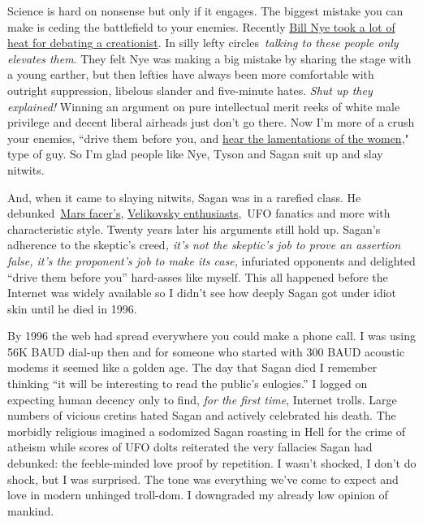 Science is hard on nonsense but only if it engages. The biggest mistake
you can make is ceding the battlefield to your enemies. Recently
\href{http://www.huffingtonpost.com/david-macmillan/bill-nye-creation-debate_b_4775207.html}{Bill
Nye took a lot of heat for debating a creationist}. In silly lefty
circles\emph{~talking to these people only elevates them}. They felt Nye
was making a big mistake by sharing the stage with a young earther, but
then lefties have always been more comfortable with outright
suppression, libelous slander and five-minute hates. \emph{Shut up they
explained!} Winning an argument on pure intellectual merit reeks of
white male privilege and decent liberal airheads just don't go there.
Now I'm more of a crush your enemies, ``drive them before you, and
\href{https://www.youtube.com/watch?v=6PQ6335puOc}{hear the lamentations
of the women}," type of guy. So I'm glad people like Nye, Tyson and
Sagan suit up and slay nitwits.

And, when it came to slaying nitwits, Sagan was in a rarefied class. He
debunked~\href{http://science1.nasa.gov/science-news/science-at-nasa/2001/ast24may_1/}{Mars
facer's}, \href{http://www.skepdic.com/velikov.html}{Velikovsky
enthusiasts},~UFO fanatics and more with characteristic style. Twenty
years later his arguments still hold up. Sagan's adherence to the
skeptic's creed\emph{, it's not the skeptic's job to prove an assertion
false, it's the proponent's job to make its case,} infuriated opponents
and delighted ``drive them before you'' hard-asses like myself. This all
happened before the Internet was widely available so I didn't see how
deeply Sagan got under idiot skin until he died in 1996.

By 1996 the web had spread everywhere you could make a phone call. I was
using 56K BAUD dial-up then and for someone who started with 300 BAUD
acoustic modems it seemed like a golden age. The day that Sagan died I
remember thinking ``it will be interesting to read the public's
eulogies.''  I logged on expecting human decency only to find, \emph{for
the first time}, Internet trolls. Large numbers of vicious cretins hated
Sagan and actively celebrated his death. The morbidly religious imagined
a sodomized Sagan roasting in Hell for the crime of atheism while scores
of UFO dolts reiterated the very fallacies Sagan had debunked: the
feeble-minded love proof by repetition. I wasn't shocked, I don't do
shock, but I was surprised. The tone was everything we've come to expect
and love in modern unhinged troll-dom. I downgraded my already low
opinion of mankind.

